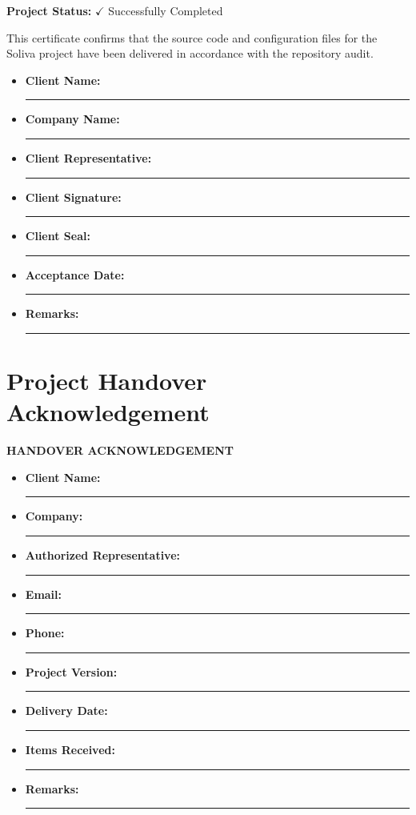 \documentclass[11pt,a4paper]{article}
\newcommand{\siglabel}[1]{\textbf{#1:} \rule{7cm}{0.4pt}}
\begin{document}
\vspace{0.8cm}
\noindent\textbf{Project Status:} \quad $\checkmark$ Successfully Completed

\vspace{0.5cm}
\noindent This certificate confirms that the source code and configuration
files for the Soliva project have been delivered in accordance with the
repository audit.

\vspace{1cm}
\begin{itemize}[leftmargin=*, itemsep=14pt, label={}]
    \item \siglabel{Client Name}
    \item \siglabel{Company Name}
    \item \siglabel{Client Representative}
    \item \siglabel{Client Signature}
    \item \siglabel{Client Seal}
    \item \siglabel{Acceptance Date}
    \item \siglabel{Remarks}
\end{itemize}

\newpage
\section{Project Handover Acknowledgement}
\begin{center}
    {\LARGE\bfseries HANDOVER ACKNOWLEDGEMENT}\\[1cm]
\end{center}

\begin{itemize}[leftmargin=*, itemsep=14pt, label={}]
    \item \siglabel{Client Name}
    \item \siglabel{Company}
    \item \siglabel{Authorized Representative}
    \item \siglabel{Email}
    \item \siglabel{Phone}
    \item \siglabel{Project Version}
    \item \siglabel{Delivery Date}
    \item \siglabel{Items Received}
    \item \siglabel{Remarks}
\end{itemize}
\end{document}
